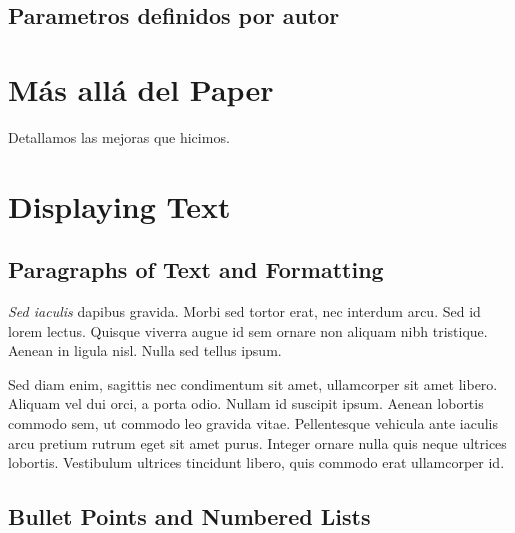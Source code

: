 \documentclass[
paper=128mm:96mm, %
fontsize=11pt, %
pagesize, %
parskip=half-, %
]{scrartcl} %
\newcommand*{\mygreen}[1]{\textcolor{mygreen}{#1}}
\newcommand*{\myblue}[1]{\textcolor{myblue}{#1}}
\newcommand*{\mybrown}[1]{\textcolor{mybrown}{#1}}
\newcommand*{\myred}[1]{\textcolor{myred}{#1}}
\theoremstyle{mythmstyle} %
\begin{document}
\subsection{Parametros definidos por autor}

\clearpage



\section{M\'as all\'a del Paper}

Detallamos las mejoras que hicimos.


\clearpage


\section{Displaying Text}

\clearpage



\subsection{Paragraphs of Text and Formatting}

\textit{Sed iaculis} dapibus gravida. Morbi sed tortor erat, nec interdum arcu. Sed id lorem lectus. Quisque viverra augue id sem ornare non aliquam nibh tristique. Aenean in ligula nisl. Nulla sed tellus ipsum.

\begin{multicols}{2} %
\mygreen{Sed diam enim, sagittis nec} condimentum sit amet, ullamcorper sit amet libero. \mybrown{Aliquam vel dui orci}, a porta odio. \myred{Nullam id suscipit} ipsum. \myblue{Aenean lobortis} commodo sem, ut commodo leo gravida vitae. Pellentesque vehicula ante iaculis arcu pretium rutrum eget sit amet purus. Integer ornare nulla quis neque ultrices lobortis. Vestibulum ultrices tincidunt libero, quis commodo erat ullamcorper id.
\end{multicols}

\clearpage


\subsection{Bullet Points and Numbered Lists}
\end{document}
